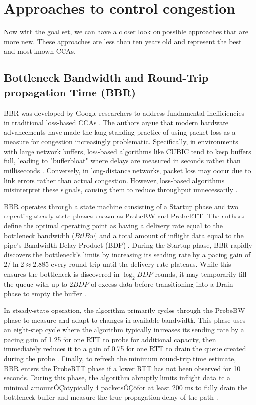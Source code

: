 \documentclass[conference]{IEEEtran}
\begin{document}
\section{Approaches to control congestion}\label{sec:Approach}

Now with the goal set, we can have a closer look on possible approaches that are more new.
These approaches are less than ten years old and represent the best and most known \ac{CCA}s.

\subsection{Bottleneck Bandwidth and Round-Trip propagation Time (BBR)}

BBR was developed by Google researchers to address fundamental inefficiencies in traditional loss-based \acs{CCA}s \cite{BBRORIGINAL}. 
The authors argue that modern hardware advancements have made the long-standing practice of using packet loss as a measure for congestion increasingly problematic. 
Specifically, in environments with large network buffers, loss-based algorithms like CUBIC tend to keep buffers full, leading to "bufferbloat" where delays are measured in seconds rather than milliseconds . 
Conversely, in long-distance networks, packet loss may occur due to link errors rather than actual congestion.
However, loss-based algorithms misinterpret these signals, causing them to reduce throughput unnecessarily \cite{BBRORIGINAL}.

BBR operates through a state machine consisting of a Startup phase and two repeating steady-state phases known as ProbeBW and ProbeRTT\cite{BBREVALUATION}. 
The authors define the optimal operating point as having a delivery rate equal to the bottleneck bandwidth ($BtlBw$) and a total amount of inflight data equal to the pipe's Bandwidth-Delay Product (BDP) \cite{BBRORIGINAL}. 
During the Startup phase, BBR rapidly discovers the bottleneck's limits by increasing its sending rate by a pacing gain of $2/\ln 2 \approx 2.885$ every round trip until the delivery rate plateaus.
While this ensures the bottleneck is discovered in $\log_2 BDP$ rounds, it may temporarily fill the queue with up to $2BDP$ of excess data before transitioning into a Drain phase to empty the buffer \cite{BBRORIGINAL, BBREVALUATION}.

In steady-state operation, the algorithm primarily cycles through the ProbeBW phase to measure and adapt to changes in available bandwidth. 
This phase uses an eight-step cycle where the algorithm typically increases its sending rate by a pacing gain of 1.25 for one RTT to probe for additional capacity, then immediately reduces it to a gain of 0.75 for one RTT to drain the queue created during the probe \cite{BBREVALUATION}. 
Finally, to refresh the minimum round-trip time estimate, BBR enters the ProbeRTT phase if a lower RTT has not been observed for 10 seconds. 
During this phase, the algorithm abruptly limits inflight data to a minimal amountÔÇötypically 4 packetsÔÇöfor at least 200 ms to fully drain the bottleneck buffer and measure the true propagation delay of the path \cite{BBRORIGINAL, BBREVALUATION}.
\end{document}
